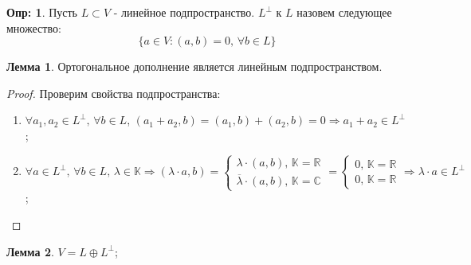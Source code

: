 \documentclass[12pt]{article}
\newcommand{\MR}{\mathbb{R}}
\newcommand{\MC}{\mathbb{C}}
\newcommand{\MK}{\mathbb{K}}
\theoremstyle{definition}
\newtheorem{defn}{Опр:}
\newtheorem{lemma}{Лемма}
\begin{document}
\begin{defn}
	Пусть $L \subset V$ - линейное подпространство.  $L^\bot$ к $L$ назовем следующее множество: 
	$$
		\{a \in V \colon (a,b) = 0, \, \forall b \in L\}
	$$
\end{defn}
\begin{lemma}
	Ортогональное дополнение является линейным подпространством.
\end{lemma}
\begin{proof}
	Проверим свойства подпространства:
	\begin{enumerate}[label ={(\arabic*)}]
		\item $\forall a_1, a_2 \in L^\bot, \, \forall b \in L$, $(a_1 + a_2, b) = (a_1,b) + (a_2,b) = 0  \Rightarrow a_1 + a_2 \in L^\bot$;
		\item $\forall a \in L^\bot, \, \forall b \in L, \, \lambda \in \MK \Rightarrow (\lambda{\cdot}a,b) = \begin{cases}
			\lambda{\cdot}(a,b), \, \MK = \MR \\
			\overline{\lambda}{\cdot}(a,b), \, \MK = \MC
		\end{cases} = 
		\begin{cases}
			0, \, \MK = \MR\\
			0, \, \MK = \MR
		\end{cases} \Rightarrow \lambda{\cdot}a \in L^\bot
	$;
	\end{enumerate}
\end{proof}
\begin{lemma}
	$V = L \oplus L^\bot$;
\end{lemma}
\end{document}
